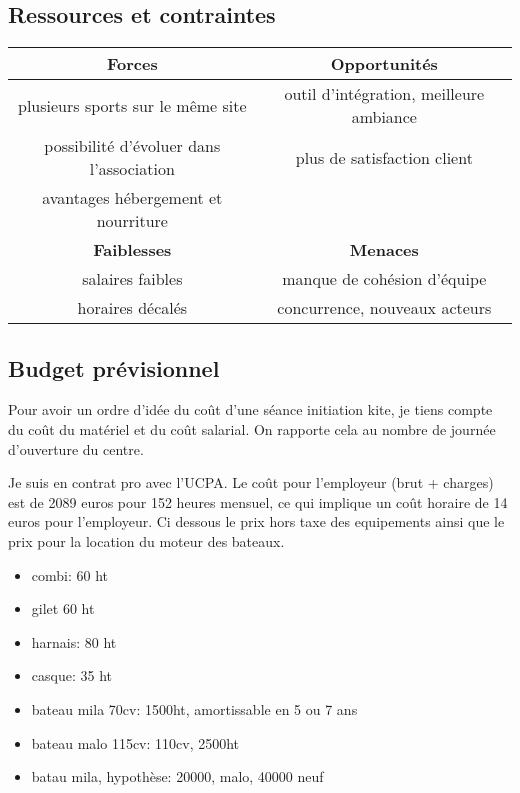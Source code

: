 \documentclass[12pt,a4paper]{report}
\begin{document}
\subsection{Ressources et contraintes}
\begin{tabular}{|c|c|}
        \hline
        \textbf{Forces}                          & \textbf{Opportunités} \\ 
        \hline
        plusieurs sports sur le m\^eme site      &  outil d'intégration, meilleure ambiance\\
        possibilité d'évoluer dans l'association & plus de satisfaction client  \\
        avantages hébergement et nourriture      &                              \\
        \hline
        \textbf{Faiblesses}                      &  \textbf{Menaces} \\ 
        \hline
        salaires faibles                         & manque de cohésion d'équipe \\
        horaires décalés                         & concurrence, nouveaux acteurs   \\
        \hline
\end{tabular}

\subsection{Budget prévisionnel}
Pour avoir un ordre d'idée du coût d'une séance initiation kite, je
tiens compte du co\^ut du matériel et du co\^ut salarial. On rapporte 
cela au nombre de journée d'ouverture du centre.

Je suis en contrat pro avec l'UCPA. Le coût pour l'employeur (brut + charges) est
de 2089 euros pour 152 heures mensuel, 
ce qui implique un coût horaire de 14 euros pour l'employeur.
Ci dessous le prix hors taxe des equipements ainsi
que le prix pour la location du moteur des bateaux.
\begin{itemize}
\item combi: 60 ht
\item gilet 60 ht
\item harnais: 80 ht
\item casque: 35 ht
\item bateau mila 70cv: 1500ht, amortissable en 5 ou 7 ans
\item bateau malo 115cv: 110cv, 2500ht
\item batau mila, hypothèse: 20000, malo, 40000 neuf
\end{itemize}
\end{document}
